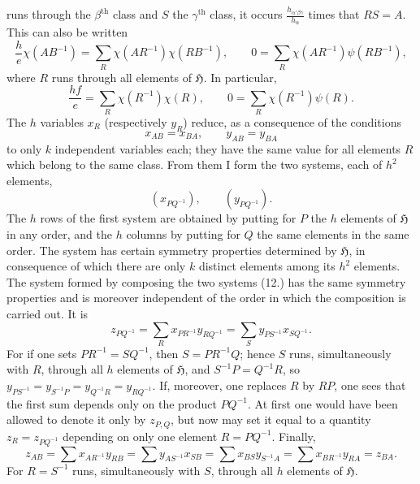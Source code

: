 \documentclass[11pt]{article}
\newcommand{\grp}{\mathfrak{H}}
\begin{document}
runs through the $\beta^{\text{th}}$ class and $S$ the $\gamma^{\text{th}}$ class, it occurs $\frac{h_{\alpha'\beta\gamma}}{h_\alpha}$ times that $RS=A$. This can also be written
\begin{equation*}\tag{9.}
\frac{h}{e}\chi(AB^{-1})=\sum_R\chi(AR^{-1})\chi(RB^{-1}),\qquad 0=\sum_R\chi(AR^{-1})\psi(RB^{-1}),
\end{equation*}
where $R$ runs through all elements of $\grp$. In particular,
\begin{equation*}\tag{10.}
\frac{hf}{e}=\sum_R\chi(R^{-1})\chi(R),\qquad 0=\sum_R\chi(R^{-1})\psi(R).
\end{equation*}
The $h$ variables $x_R$ (respectively $y_R$) reduce, as a consequence of the conditions
\begin{equation*}\tag{11.}
x_{AB}=x_{BA},\qquad y_{AB}=y_{BA}
\end{equation*}
to only $k$ independent variables each; they have the same value for all elements $R$ which belong to the same class. From them I form the two systems, each of $h^2$ elements,
\begin{equation*}\tag{12.}
(x_{PQ^{-1}}),\qquad (y_{PQ^{-1}}).
\end{equation*}
The $h$ rows of the first system are obtained by putting for $P$ the $h$ elements of $\grp$ in any order, and the $h$ columns by putting for $Q$ the same elements in the same order. The system has certain symmetry properties determined by $\grp$, in consequence of which there are only $k$ distinct elements among its $h^2$ elements. The system formed by composing the two systems (12.) has the same symmetry properties and is moreover independent of the order in which the composition is carried out. It is
\begin{equation*}\tag{13.}
z_{PQ^{-1}}=\sum_R x_{PR^{-1}}y_{RQ^{-1}}=\sum_S y_{PS^{-1}}x_{SQ^{-1}}.
\end{equation*}
For if one sets $PR^{-1}=SQ^{-1}$, then $S=PR^{-1}Q$; hence $S$ runs, simultaneously with $R$, through all $h$ elements of $\grp$, and $S^{-1}P=Q^{-1}R$, so $y_{PS^{-1}}=y_{S^{-1}P}=y_{Q^{-1}R}=y_{RQ^{-1}}$. If, moreover, one replaces $R$ by $RP$, one sees that the first sum depends only on the product $PQ^{-1}$. At first one would have been allowed to denote it only by $z_{P,Q}$, but now may set it equal to a quantity $z_R=z_{PQ^{-1}}$ depending on only one element $R=PQ^{-1}$. Finally,
\[
z_{AB}=\sum x_{AR^{-1}}y_{RB}=\sum y_{AS^{-1}}x_{SB}=\sum x_{BS}y_{S^{-1}A}=\sum x_{BR^{-1}}y_{RA}=z_{BA}.
\]
For $R=S^{-1}$ runs, simultaneously with $S$, through all $h$ elements of $\grp$.
\end{document}
